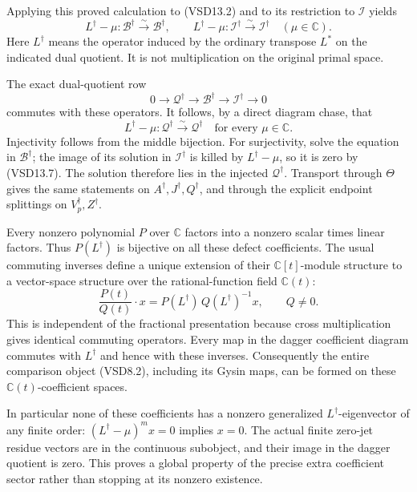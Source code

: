 Applying this proved calculation to (VSD13.2) and to its restriction to
\(\mathcal I\) yields \[
L^\dagger-\mu:\mathcal B^\dagger\xrightarrow{\sim}\mathcal B^\dagger,
\qquad
L^\dagger-\mu:\mathcal I^\dagger\xrightarrow{\sim}\mathcal I^\dagger
\quad(\mu\in\mathbb C).
\tag{VSD13.7}
\] Here \(L^\dagger\) means the operator induced by the ordinary
transpose \(L^*\) on the indicated dual quotient. It is not
multiplication on the original primal space.

The exact dual-quotient row \[
0\to\mathcal Q^\dagger\to\mathcal B^\dagger\to\mathcal I^\dagger\to0
\tag{VSD13.8}
\] commutes with these operators. It follows, by a direct diagram chase,
that \[
\boxed{L^\dagger-\mu:
\mathcal Q^\dagger\xrightarrow{\sim}\mathcal Q^\dagger
\quad\text{for every }\mu\in\mathbb C.}
\tag{VSD13.9}
\] Injectivity follows from the middle bijection. For surjectivity,
solve the equation in \(\mathcal B^\dagger\); the image of its solution
in \(\mathcal I^\dagger\) is killed by \(L^\dagger-\mu\), so it is zero
by (VSD13.7). The solution therefore lies in the injected
\(\mathcal Q^\dagger\). Transport through \(\Theta\) gives the same
statements on \(A^\dagger,J^\dagger,Q^\dagger\), and through the
explicit endpoint splittings on \(V_p^\dagger,Z^\dagger\).

Every nonzero polynomial \(P\) over \(\mathbb C\) factors into a nonzero
scalar times linear factors. Thus \(P(L^\dagger)\) is bijective on all
these defect coefficients. The usual commuting inverses define a unique
extension of their \(\mathbb C[t]\)-module structure to a vector-space
structure over the rational-function field \(\mathbb C(t)\): \[
\frac{P(t)}{Q(t)}\cdot x
=P(L^\dagger)\,Q(L^\dagger)^{-1}x,\qquad Q\ne0.
\tag{VSD13.10}
\] This is independent of the fractional presentation because cross
multiplication gives identical commuting operators. Every map in the
dagger coefficient diagram commutes with \(L^\dagger\) and hence with
these inverses. Consequently the entire comparison object (VSD8.2),
including its Gysin maps, can be formed on these
\(\mathbb C(t)\)-coefficient spaces.

In particular none of these coefficients has a nonzero generalized
\(L^\dagger\)-eigenvector of any finite order: \((L^\dagger-\mu)^m x=0\)
implies \(x=0\). The actual finite zero-jet residue vectors are in the
continuous subobject, and their image in the dagger quotient is zero.
This proves a global property of the precise extra coefficient sector
rather than stopping at its nonzero existence.

